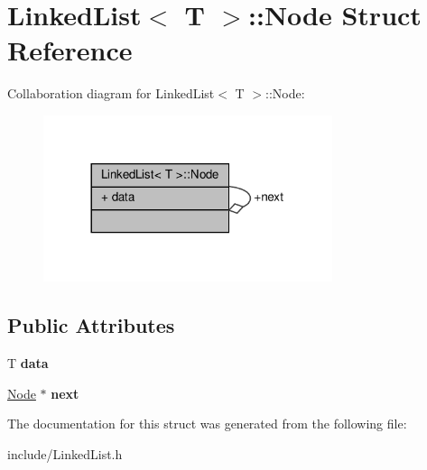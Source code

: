 \hypertarget{structLinkedList_1_1Node}{}\section{Linked\+List$<$ T $>$\+:\+:Node Struct Reference}
\label{structLinkedList_1_1Node}


Collaboration diagram for Linked\+List$<$ T $>$\+:\+:Node\+:
\nopagebreak
\begin{figure}[H]
\begin{center}
\leavevmode
\includegraphics[width=240pt]{structLinkedList_1_1Node__coll__graph}
\end{center}
\end{figure}
\subsection*{Public Attributes}
\begin{DoxyCompactItemize}
\item 
\mbox{\label{structLinkedList_1_1Node_ad2de6fe830fed52d6782ff2caacc51ac}} 
T {\bfseries data}
\item 
\mbox{\label{structLinkedList_1_1Node_aaf5f5d6645d0854e3ed2493bbea57f78}} 
\hyperlink{structLinkedList_1_1Node}{Node} $\ast$ {\bfseries next}
\end{DoxyCompactItemize}


The documentation for this struct was generated from the following file\+:\begin{DoxyCompactItemize}
\item 
include/Linked\+List.\+h\end{DoxyCompactItemize}

